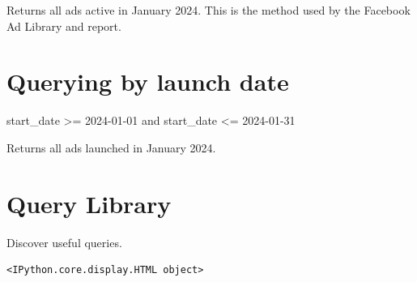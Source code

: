 \documentclass[
  letterpaper,
  DIV=11,
  numbers=noendperiod]{scrreprt}
\newenvironment{Shaded}{\begin{snugshade}}{\end{snugshade}}
\newcommand{\DecValTok}[1]{\textcolor[rgb]{0.68,0.00,0.00}{#1}}
\newcommand{\KeywordTok}[1]{\textcolor[rgb]{0.00,0.23,0.31}{#1}}
\newcommand{\NormalTok}[1]{\textcolor[rgb]{0.00,0.23,0.31}{#1}}
\newcommand{\OperatorTok}[1]{\textcolor[rgb]{0.37,0.37,0.37}{#1}}
\begin{document}
Returns all ads active in January 2024. This is the method used by the
Facebook Ad Library and report.

\chapter{Querying by launch date}

\begin{Shaded}
\begin{Highlighting}[]
\NormalTok{start\_date }\OperatorTok{\textgreater{}=} \DecValTok{2024}\OperatorTok{{-}}\DecValTok{01}\OperatorTok{{-}}\DecValTok{01} \KeywordTok{and}\NormalTok{ start\_date }\OperatorTok{\textless{}=} \DecValTok{2024}\OperatorTok{{-}}\DecValTok{01}\OperatorTok{{-}}\DecValTok{31}
\end{Highlighting}
\end{Shaded}

Returns all ads launched in January 2024.


\chapter{Query Library}\label{sec-library}

Discover useful queries.

\begin{verbatim}
<IPython.core.display.HTML object>
\end{verbatim}
\end{document}

